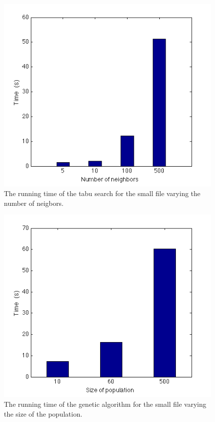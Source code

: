 \documentclass[titlepage,a4paper]{article}
\begin{document}
\begin{figure}[H]
  \begin{center}
    \includegraphics[scale=0.5]{../results/tabu_neighbor.png}
  \end{center}
  \caption{The running time of the tabu search for the small file varying the number of neigbors.}
  \label{tabu_neighbor}
\end{figure}

\begin{figure}[H]
  \begin{center}
    \includegraphics[scale=0.5]{../results/genetic_population.png}
  \end{center}
  \caption{The running time of the genetic algorithm for the small file varying the size of the population.}
  \label{genetic_pop}
\end{figure}
\end{document}
